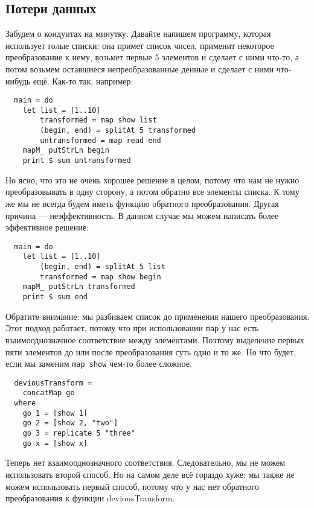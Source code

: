 \subsection{Потери данных} 
Забудем о кондуитах на минутку. Давайте напишем программу, которая использует 
голые списки: она примет список чисел, применит некоторое преобразование к нему,
возьмет первые 5 элементов и сделает с ними что-то, а потом возьмем оставшиеся
непреобразованные денные и сделает с ними что-нибудь ещё. Как-то так, например:
\begin{lstlisting}
  main = do
    let list = [1..10]
        transformed = map show list
        (begin, end) = splitAt 5 transformed
        untransformed = map read end
    mapM_ putStrLn begin
    print $ sum untransformed
\end{lstlisting}
Но ясно, что это не очень хорошее решение в целом, потому что нам не нужно 
преобразовывать в одну сторону, а потом обратно все элементы списка. К тому же 
мы не всегда будем иметь функцию обратного преобразования. Другая причина 
--- неэффективность. В данном случае мы можем написать более эффективное решение:
\begin{lstlisting}
  main = do
    let list = [1..10]
        (begin, end) = splitAt 5 list
        transformed = map show begin
    mapM_ putStrLn transformed
    print $ sum end
\end{lstlisting}
Обратите внимание: мы разбиваем список до применения  нашего преобразования. 
Этот подход работает, потому что при использовании \lstinline'map' у нас есть
 взаимооднозначное соответствие между элементами. Поэтому выделение первых пяти 
 элементов до или после преобразования суть одно и то же. Но что будет, если мы 
 заменим \lstinline'map show' чем-то более сложное.
\begin{lstlisting}
  deviousTransform =
    concatMap go
  where
    go 1 = [show 1]
    go 2 = [show 2, "two"]
    go 3 = replicate 5 "three"
    go x = [show x]
\end{lstlisting}
Теперь нет взаимооднозначного соответствия. Следовательно, мы не можем 
использовать второй способ. Но на самом деле всё гораздо хуже: мы также не можем 
использовать первый способ, потому что у нас нет обратного преобразования к 
функции deviousTransform.
 
